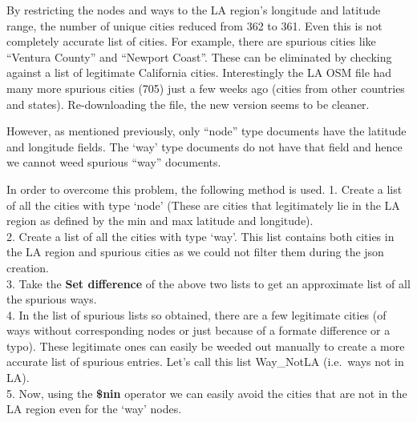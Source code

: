\documentclass[]{article}
\newenvironment{Shaded}{\begin{snugshade}}{\end{snugshade}}
\newcommand{\DecValTok}[1]{\textcolor[rgb]{0.86,0.86,0.80}{{#1}}}
\newcommand{\StringTok}[1]{\textcolor[rgb]{0.80,0.58,0.58}{{#1}}}
\newcommand{\CommentTok}[1]{\textcolor[rgb]{0.50,0.62,0.50}{{#1}}}
\newcommand{\OtherTok}[1]{\textcolor[rgb]{0.94,0.94,0.56}{{#1}}}
\newcommand{\NormalTok}[1]{\textcolor[rgb]{0.80,0.80,0.80}{{#1}}}
\begin{document}
\begin{Shaded}
\end{Shaded}

By restricting the nodes and ways to the LA region's longitude and
latitude range, the number of unique cities reduced from 362 to 361.
Even this is not completely accurate list of cities. For example, there
are spurious cities like ``Ventura County'' and ``Newport Coast''. These
can be eliminated by checking against a list of legitimate California
cities. Interestingly the LA OSM file had many more spurious cities
(705) just a few weeks ago (cities from other countries and states).
Re-downloading the file, the new version seems to be cleaner.

However, as mentioned previously, only ``node'' type documents have the
latitude and longitude fields. The `way' type documents do not have that
field and hence we cannot weed spurious ``way'' documents.

In order to overcome this problem, the following method is used. 1.
Create a list of all the cities with type `node' (These are cities that
legitimately lie in the LA region as defined by the min and max latitude
and longitude).\\2. Create a list of all the cities with type `way'.
This list contains both cities in the LA region and spurious cities as
we could not filter them during the json creation.\\3. Take the
\textbf{Set difference} of the above two lists to get an approximate
list of all the spurious ways.\\4. In the list of spurious lists so
obtained, there are a few legitimate cities (of ways without
corresponding nodes or just because of a formate difference or a typo).
These legitimate ones can easily be weeded out manually to create a more
accurate list of spurious entries. Let's call this list Way\_NotLA
(i.e.~ways not in LA).\\5. Now, using the \textbf{\$nin} operator we can
easily avoid the cities that are not in the LA region even for the `way'
nodes.
\end{document}
